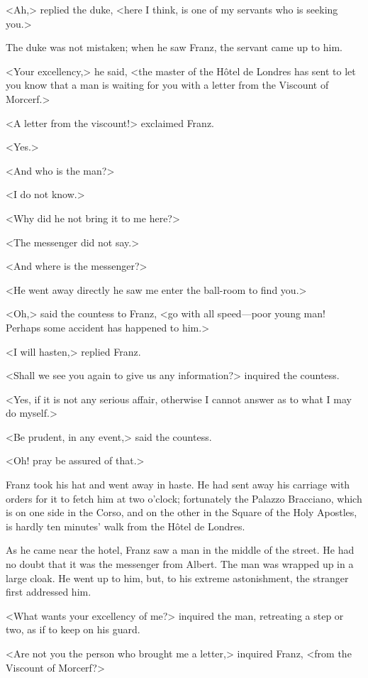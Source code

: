  <Ah,> replied the duke, <here I think, is one of my servants who is seeking you.> 

 The duke was not mistaken; when he saw Franz, the servant came up to him. 

 <Your excellency,> he said, <the master of the Hôtel de Londres has sent to let you know that a man is waiting for you with a letter from the Viscount of Morcerf.> 

 <A letter from the viscount!> exclaimed Franz. 

 <Yes.> 

 <And who is the man?> 

 <I do not know.> 

 <Why did he not bring it to me here?> 

 <The messenger did not say.> 

 <And where is the messenger?> 

 <He went away directly he saw me enter the ball-room to find you.> 

 <Oh,> said the countess to Franz, <go with all speed—poor young man! Perhaps some accident has happened to him.> 

 <I will hasten,> replied Franz. 

 <Shall we see you again to give us any information?> inquired the countess. 

 <Yes, if it is not any serious affair, otherwise I cannot answer as to what I may do myself.> 

 <Be prudent, in any event,> said the countess. 

 <Oh! pray be assured of that.> 

 Franz took his hat and went away in haste. He had sent away his carriage with orders for it to fetch him at two o'clock; fortunately the Palazzo Bracciano, which is on one side in the Corso, and on the other in the Square of the Holy Apostles, is hardly ten minutes' walk from the Hôtel de Londres. 

 As he came near the hotel, Franz saw a man in the middle of the street. He had no doubt that it was the messenger from Albert. The man was wrapped up in a large cloak. He went up to him, but, to his extreme astonishment, the stranger first addressed him. 

 <What wants your excellency of me?> inquired the man, retreating a step or two, as if to keep on his guard. 

 <Are not you the person who brought me a letter,> inquired Franz, <from the Viscount of Morcerf?> 

